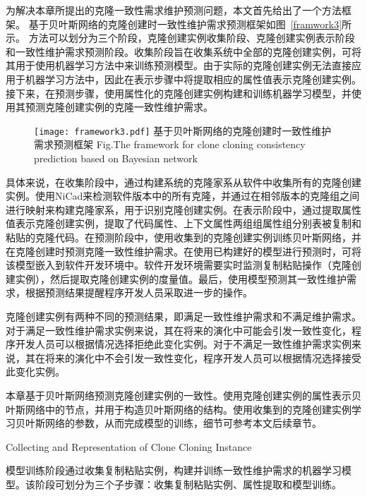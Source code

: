 为解决本章所提出的克隆一致性需求维护预测问题，本文首先给出了一个方法框架。
基于贝叶斯网络的克隆创建时一致性维护需求预测框架如图~\ref{framwork3}所示。
方法可以划分为三个阶段，克隆创建实例收集阶段、克隆创建实例表示阶段和一致性维护需求预测阶段。收集阶段旨在收集系统中全部的克隆创建实例，可将其用于使用机器学习方法中来训练预测模型。由于实际的克隆创建实例无法直接应用于机器学习方法中，因此在表示步骤中将提取相应的属性值表示克隆创建实例。接下来，在预测步骤，使用属性化的克隆创建实例构建和训练机器学习模型，并使用其预测克隆创建实例的克隆一致性维护需求。

\begin{figure}[htbp]
\centering
\texttt{[image: framework3.pdf]}
\bicaption[framwork3]{}
{基于贝叶斯网络的克隆创建时一致性维护需求预测框架}
{Fig.$\!$}{The framework for clone cloning consistency prediction based on Bayesian network}
\vspace{-1em}
\end{figure}

具体来说，在收集阶段中，通过构建系统的克隆家系从软件中收集所有的克隆创建实例。使用NiCad来检测软件版本中的所有克隆，并通过在相邻版本的克隆组之间进行映射来构建克隆家系，用于识别克隆创建实例。在表示阶段中，通过提取属性值表示克隆创建实例，提取了代码属性、上下文属性两组组属性组分别表被复制和粘贴的克隆代码。在预测阶段中，使用收集到的克隆创建实例训练贝叶斯网络，并在克隆创建时预测克隆一致性维护需求。在使用已构建好的模型进行预测时，可将该模型嵌入到软件开发环境中。软件开发环境需要实时监测复制粘贴操作（克隆创建实例），然后提取克隆创建实例的度量值。最后，使用模型预测其一致性维护需求，根据预测结果提醒程序开发人员采取进一步的操作。

克隆创建实例有两种不同的预测结果，即满足一致性维护需求和不满足维护需求。
对于满足一致性维护需求实例来说，其在将来的演化中可能会引发一致性变化，程序开发人员可以根据情况选择拒绝此变化实例。对于不满足一致性维护需求实例来说，其在将来的演化中不会引发一致性变化，程序开发人员可以根据情况选择接受此变化实例。

本章基于贝叶斯网络预测克隆创建实例的一致性。使用克隆创建实例的属性表示贝叶斯网络中的节点，并用于构造贝叶斯网络的结构。使用收集到的克隆创建实例学习贝叶斯网络的参数，从而完成模型的训练，细节可参考本文后续章节。

{Collecting and Representation of Clone Cloning Instance}

模型训练阶段通过收集复制粘贴实例，构建并训练一致性维护需求的机器学习模型。该阶段可划分为三个子步骤：收集复制粘贴实例、属性提取和模型训练。

